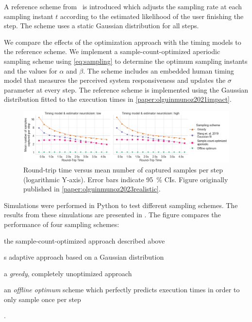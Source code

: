 A reference scheme from~\cite{wang2019towards} is introduced which adjusts the sampling rate at each sampling instant \ensuremath{t} according to the estimated likelihood of the user finishing the step.
The scheme uses a static Gaussian distribution for all steps.

We compare the effects of the optimization approach with the timing models to the reference scheme.
We implement a sample-count-optimized aperiodic sampling scheme using \cref{eq:sampling} to determine the optimum sampling instants and the values for \ensuremath{\alpha} and \ensuremath{\beta}.
The scheme includes an embedded human timing model that measures the perceived system responsiveness and updates the \ensuremath{\sigma} parameter at every step.
The reference scheme is implemented using the Gaussian distribution fitted to the execution times in \cref{paper:olguinmunoz2021impact}.

\begin{figure}
    \centering
    \includegraphics[width=\textwidth]{publications/2023EdgeDroid2/figs/new_model/sampling_optimization}
    \caption{%
        Round-trip time versus mean number of captured samples per step (logarithmic Y-axis).
        Error bars indicate \SI{95}{\percent} \glspl{CI}.
        Figure originally published in \cref{paper:olguinmunoz2023realistic}.
    }\label{fig:samplingresults}
\end{figure}

Simulations were performed in Python to test different sampling schemes.
The results from these simulations are presented in .
The figure compares the performance of four sampling schemes:
\begin{inlineenum}
    \item the sample-count-optimized approach described above
    \item \citeauthor{wang2019towards}s adaptive approach based on a Gaussian distribution
    \item a \emph{greedy}, completely unoptimized approach
    \item an \emph{offline optimum} scheme which perfectly predicts execution times in order to only sample once per step
\end{inlineenum}.

